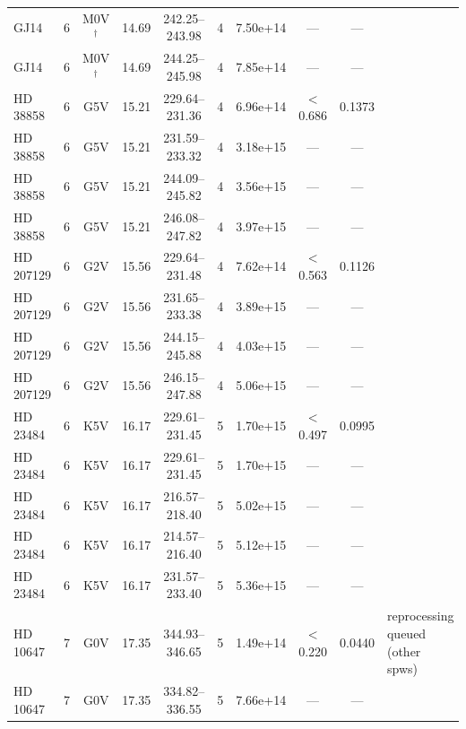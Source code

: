 \documentclass{openjournal}
\begin{document}
\begin{table}
\begin{tabularx}{\textwidth}{@{}l c c c c c c c c X@{}}
GJ14 & 6 & M0V$^\dagger$ & 14.69 & 242.25--243.98 & 4 & 7.50e+14 & --- & --- &  \\
GJ14 & 6 & M0V$^\dagger$ & 14.69 & 244.25--245.98 & 4 & 7.85e+14 & --- & --- &  \\
HD 38858 & 6 & G5V & 15.21 & 229.64--231.36 & 4 & 6.96e+14 & $<$0.686 & 0.1373 &  \\
HD 38858 & 6 & G5V & 15.21 & 231.59--233.32 & 4 & 3.18e+15 & --- & --- &  \\
HD 38858 & 6 & G5V & 15.21 & 244.09--245.82 & 4 & 3.56e+15 & --- & --- &  \\
HD 38858 & 6 & G5V & 15.21 & 246.08--247.82 & 4 & 3.97e+15 & --- & --- &  \\
HD 207129 & 6 & G2V & 15.56 & 229.64--231.48 & 4 & 7.62e+14 & $<$0.563 & 0.1126 &  \\
HD 207129 & 6 & G2V & 15.56 & 231.65--233.38 & 4 & 3.89e+15 & --- & --- &  \\
HD 207129 & 6 & G2V & 15.56 & 244.15--245.88 & 4 & 4.03e+15 & --- & --- &  \\
HD 207129 & 6 & G2V & 15.56 & 246.15--247.88 & 4 & 5.06e+15 & --- & --- &  \\
HD 23484 & 6 & K5V & 16.17 & 229.61--231.45 & 5 & 1.70e+15 & $<$0.497 & 0.0995 &  \\
HD 23484 & 6 & K5V & 16.17 & 229.61--231.45 & 5 & 1.70e+15 & --- & --- &  \\
HD 23484 & 6 & K5V & 16.17 & 216.57--218.40 & 5 & 5.02e+15 & --- & --- &  \\
HD 23484 & 6 & K5V & 16.17 & 214.57--216.40 & 5 & 5.12e+15 & --- & --- &  \\
HD 23484 & 6 & K5V & 16.17 & 231.57--233.40 & 5 & 5.36e+15 & --- & --- &  \\
HD 10647 & 7 & G0V & 17.35 & 344.93--346.65 & 5 & 1.49e+14 & $<$0.220 & 0.0440 & reprocessing queued (other spws) \\
HD 10647 & 7 & G0V & 17.35 & 334.82--336.55 & 5 & 7.66e+14 & --- & --- &  \\
\hline
\end{tabularx}
\end{table}
\end{document}
